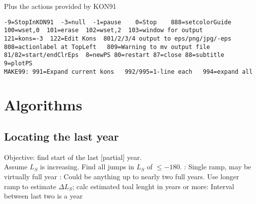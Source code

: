 \documentclass{article}  %
\begin{document}
Plus the actions provided by KON91
\vspace{-3.mm} 
\begin{verbatim}
-9=StopInKON91  -3=null  -1=pause    0=Stop    888=setcolorGuide
100=wset,0  101=erase  102=wset,2  103=window for output
121=kons=-3  122=Edit Kons  801/2/3/4 output to eps/png/jpg/-eps
808=actionlabel at TopLeft   809=Warning to mv output file
81/82=start/endClrEps  8=newPS 80=restart 87=close 88=subtitle 9=plotPS
MAKE99: 991=Expand current kons   992/995=1-line each   994=expand all
\end{verbatim}
\section{Algorithms} %
\subsection{Locating the last year} %
Objective: find start of the last [partial] year.
\\ Assume $L_S$ is increasing. Find all jumps in $L_S$ of $\le -180$. 
: Single ramp, may be virtually full year
: Could be anything up to nearly two full years.
\qii Use longer ramp to estimate $ \Delta L_S$; calc estimated toal lenght in years
 or more: Interval between last two is a year 
\end{document}
